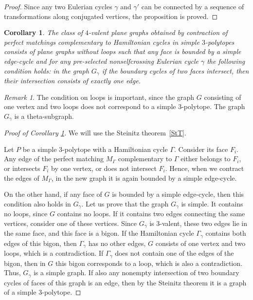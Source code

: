 \documentclass[12pt]{amsart}
\newtheorem{corollary}[formula]{Corollary}
\theoremstyle{definition}
\theoremstyle{remark}
\newtheorem{remark}[formula]{Remark}
\begin{document}
\begin{proof}
Since any two Eulerian cycles $\gamma$ and $\gamma'$ can be connected by a sequence of transformations
along conjugated vertices, the proposition is proved. 
\end{proof}

\begin{corollary}\label{corch4}
The class of $4$-valent plane graphs obtained by contraction of perfect matchings complementary to Hamiltonian cycles 
in simple $3$-polytopes consists of plane graphs without loops such that any face is bounded by a simple edge-cycle and for any pre-selected nonselfcrossing Eulerian cycle $\gamma$ the following condition holds: in the graph $G_\gamma$ if the boundary cycles of two faces intersect, then their intersection consists of exactly one edge.
\end{corollary}
\begin{remark}
The condition on loops is important, since the graph $G$ consisting of one vertex and two loops does not correspond to a simple $3$-polytope.  The graph $G_\gamma$ is a theta-subgraph.
\end{remark}
\begin{proof}[Proof of Corollary \ref{corch4}]
We will use the Steinitz theorem~\ref{StT}.

Let $P$ be a simple $3$-polytope with a Hamiltonian cycle $\Gamma$. Consider its face $F_i$. Any edge of the perfect matching
$M_\Gamma$ complementary to $\Gamma$ either belongs to $F_i$, or intersects $F_i$ by one vertex, 
or does not intersect $F_i$. Hence, when we contract the edges of $M_\Gamma$, in the new graph it is again bounded by a 
simple edge-cycle. 

On the other hand, if any face of $G$ is bounded by a simple edge-cycle, then this
condition also holds in $G_\gamma$. Let us prove that the graph $G_\gamma$ is simple. 
It contains no loops, since $G$ contains no loops. If it contains two edges connecting the same vertices, consider one of these
vertices. Since $G_\gamma$ is $3$-valent, these two edges lie in the same face, and this face is a bigon. If the 
Hamiltonian cycle $\Gamma_\gamma$ contains both edges of this bigon, then $\Gamma_\gamma$ has no other edges, 
$G$ consists of one vertex  and two loops, which is a contradiction. If $\Gamma_\gamma$ does not contain one of the edges 
of the 
bigon, then in $G$ this bigon corresponds to a loop, which is also a contradiction. Thus, $G_\gamma$ is a simple graph. If also any nonempty intersection of two boundary cycles of faces of this
graph is an edge, then by the Steinitz theorem it is a graph of a simple $3$-polytope.
\end{proof}
\end{document}
